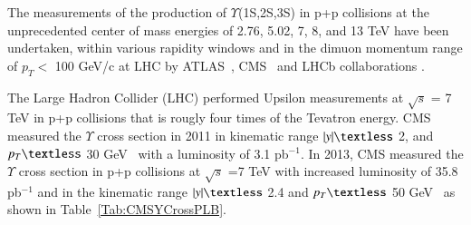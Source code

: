 The measurements of the production of $\Upsilon$(1S,2S,3S) in p+p collisions at the
unprecedented center of mass energies of 2.76, 5.02, 7, 8, and 13 TeV have been undertaken,
within various rapidity windows and in the dimuon momentum range of
$p_{T}<$ 100 GeV/c at LHC by
ATLAS~\cite{ATLAS:2011nal,ATLAS:2012lmu},
CMS~\cite{CMS:2013qur,CMS:2017dju} and LHCb collaborations \cite{LHCb:2018yzj}.

 The Large Hadron Collider (LHC) performed Upsilon measurements at 
$\surd s$ = 7 TeV in p+p collisions that is rougly four times of the Tevatron energy. 
CMS measured the $\Upsilon$ cross section in 2011 in kinematic range 
$|y|\textless$ 2, and $p_{T} \textless$ 30 GeV~\cite{CMS:2010wld} 
with a luminosity of 3.1 pb$^{-1}$.
  In 2013, CMS measured the $\Upsilon$ cross section in p+p collisions at $\surd s$ =7 TeV
with increased luminosity of 35.8 pb$^{-1}$ and in the kinematic range
$|y|\textless$ 2.4 and $p_{T}\textless$ 50 GeV~\cite{CMS:2015xqv} as shown in
Table~\ref{Tab:CMSYCrossPLB}.






